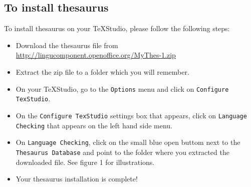 \documentclass[]{article}
\begin{document}
\subsection*{To install thesaurus}
 To install thesaurus on your TeXStudio, please follow the following steps:
 \begin{itemize}
 	\item Download the thesaurus file from \url{http://lingucomponent.openoffice.org/MyThes-1.zip}
 	\item Extract the zip file to a folder which you will remember.
 	\item On your TeXStudio, go to the \texttt{Options} menu and click on \texttt{Configure TexStudio}.
 	\item On the \texttt{Configure TexStudio} settings box that appears, click on \texttt{Language Checking} that appears on the left hand side menu. 
 	\item On \texttt{Language Checking}, click on the small blue open buttom  next to the \texttt{Thesaurus Database} and point to the folder where you extracted the downloaded file. See figure 1 for illustrations.
 	\item Your thesaurus installation is complete! 
 \end{itemize}
\end{document}
